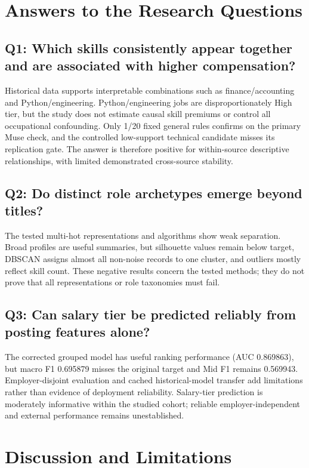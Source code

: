 \documentclass[sigconf,nonacm]{acmart}
\begin{document}
\section{Answers to the Research Questions}
\subsection{Q1: Which skills consistently appear together and are associated with higher compensation?}
Historical data supports interpretable combinations such as finance/accounting and Python/engineering. Python/engineering jobs are disproportionately High tier, but the study does not estimate causal skill premiums or control all occupational confounding. Only 1/20 fixed general rules confirms on the primary Muse check, and the controlled low-support technical candidate misses its replication gate. The answer is therefore positive for within-source descriptive relationships, with limited demonstrated cross-source stability.

\subsection{Q2: Do distinct role archetypes emerge beyond titles?}
The tested multi-hot representations and algorithms show weak separation. Broad profiles are useful summaries, but silhouette values remain below target, DBSCAN assigns almost all non-noise records to one cluster, and outliers mostly reflect skill count. These negative results concern the tested methods; they do not prove that all representations or role taxonomies must fail.

\subsection{Q3: Can salary tier be predicted reliably from posting features alone?}
The corrected grouped model has useful ranking performance (AUC 0.869863), but macro F1 0.695879 misses the original target and Mid F1 remains 0.569943. Employer-disjoint evaluation and cached historical-model transfer add limitations rather than evidence of deployment reliability. Salary-tier prediction is moderately informative within the studied cohort; reliable employer-independent and external performance remains unestablished.

\section{Discussion and Limitations}
\end{document}
